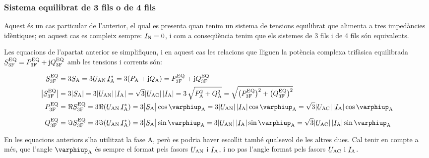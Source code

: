 \subsubsection{Sistema equilibrat de 3 fils o de 4 fils}

Aquest és un cas particular de l'anterior, el qual es presenta quan
tenim un sistema de tensions equilibrat que alimenta a tres
impedàncies idèntiques; en aquest cas es compleix sempre:
$\cmplx{I}\ped{N}=0$, i com a conseqüència tenim que els sistemes de 3
fils i de 4 fils són equivalents.

Les equacions de l'apartat anterior se simplifiquen, i en aquest
cas les relacions que lliguen la  potència complexa trifàsica
equilibrada $\cmplx{S}\ped{3F}\ap{EQ} = P\ped{3F}\ap{EQ} + \ju
Q\ped{3F}\ap{EQ}$ amb les tensions i corrents són:

\begin{align}
    \cmplx{S}\ped{3F}\ap{EQ} &= 3\cmplx{S}\ped{A} = 3\cmplx{U}\ped{AN}\, \cmplx{I}\ped{A}^* =
    3 (P\ped{A} + \ju Q\ped{A}) = P\ped{3F}\ap{EQ} +\ju Q\ped{3F}\ap{EQ} \label{eq:s_3f_eq}\\
    \big|\cmplx{S}\ped{3F}\ap{EQ}\big| &= 3|\cmplx{S}\ped{A} | =   3 |\cmplx{U}\ped{AN}| \,|\cmplx{I}\ped{A}| =
    \sqrt{3} |\cmplx{U}\ped{AC}|\, |\cmplx{I}\ped{A}| = 3\,\sqrt{P\ped{A}^2 + Q\ped{A}^2} =
    \sqrt{\big(P\ped{3F}\ap{EQ}\big)^2 + \big(Q\ped{3F}\ap{EQ}\big)^2} \\
    P\ped{3F}\ap{EQ} &= \Re\cmplx{S}\ped{3F}\ap{EQ} =3\Re(\cmplx{U}\ped{AN} \,\cmplx{I}\ped{A}^*) =
    3\big|\cmplx{S}\ped{A}\big| \cos \varphiup\ped{A} = 3 |\cmplx{U}\ped{AN}|\,
    |\cmplx{I}\ped{A}|\label{eq:p_3f_34}
    \cos \varphiup\ped{A} = \sqrt{3} |\cmplx{U}\ped{AC}|\,|\cmplx{I}\ped{A}| \cos \varphiup\ped{A} \\[2mm]
    Q\ped{3F}\ap{EQ} &= \Im\cmplx{S}\ped{3F}\ap{EQ}= 3\Im(\cmplx{U}\ped{AN}\, \cmplx{I}\ped{A}^*) =
    3\big|\cmplx{S}\ped{A}\big|  \sin \varphiup\ped{A} = 3 |\cmplx{U}\ped{AN}| \, |\cmplx{I}\ped{A}|\label{eq:q_3f_34}
    \sin\varphiup\ped{A}=\sqrt{3} |\cmplx{U}\ped{AC}|\,|\cmplx{I}\ped{A}|\sin \varphiup\ped{A}
\end{align}

En les equacions anteriors s'ha utilitzat la fase A, però es
podria haver escollit també qualsevol de les altres dues. Cal tenir
en compte a més, que l'angle $\varphiup\ped{A}$ és sempre el format
pels fasors $\cmplx{U}\ped{AN}$ i $\cmplx{I}\ped{A}$, i no pas
l'angle format pels fasors $\cmplx{U}\ped{AC}$ i
$\cmplx{I}\ped{A}$.

